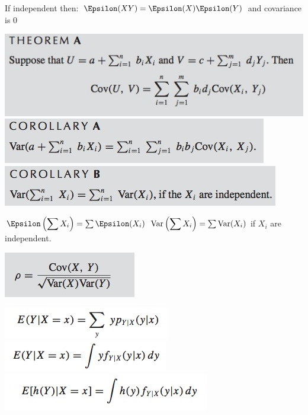 \documentclass{/out/app/latex/examnotes}
\begin{document}
{If independent then: $ \E(XY)=\E(X)\E(Y)$ and covariance is $0$

\includegraphics[scale=0.5]{./img/431.jpg}
\includegraphics[scale=0.5]{./img/432.jpg}\includegraphics[scale=0.5]{./img/433.jpg}

\disobeylines
{} %

\obeylines
$\E\left(\displaystyle\sum X_i\right)=\sum \E(X_i)$
\vspace{6pt}
$\mathrm{Var}\left(\displaystyle\sum X_i\right)=\sum \mathrm{Var}(X_i)$ if $X_i$ are independent.


\includegraphics[scale=0.5]{./img/434.jpg}

\includegraphics[scale=0.5]{./img/441.jpg}
\includegraphics[scale=0.5]{./img/442.jpg}
\includegraphics[scale=0.5]{./img/443.jpg}


}
\end{document}

